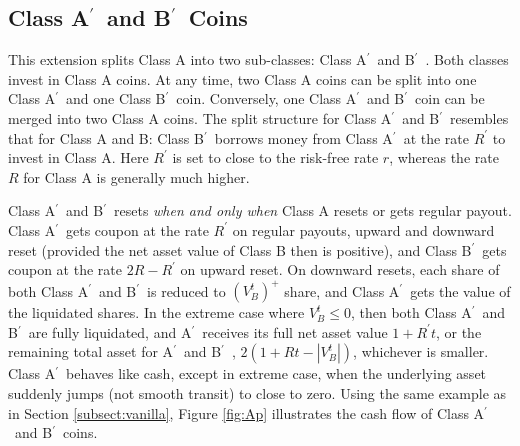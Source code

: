 \documentclass[draft, noinfoline]{ectaart}
\numberwithin{equation}{section}
\theoremstyle{plain}
\newcommand{\Ap}{A\ensuremath{^\prime}~}
\newcommand{\Bp}{B\ensuremath{^\prime}~}
\begin{document}
\subsection{\texorpdfstring{Class \Ap and \Bp Coins}{Lg}}
This extension splits Class A into two sub-classes: Class \Ap and \Bp. Both classes invest in Class A coins. At any time, two Class A coins can be split into one Class \Ap and one Class \Bp coin. Conversely, one Class \Ap and \Bp coin can be merged into two Class A coins. The split structure for Class \Ap and \Bp resembles that for Class A and B: Class \Bp borrows money from Class \Ap at the rate $R^\prime$ to invest in Class A. Here $R^\prime$ is set to close to the risk-free rate $r$, whereas the rate $R$ for Class A is generally much higher.

Class \Ap and \Bp resets {\it when and only when} Class A resets or gets regular payout. Class \Ap gets coupon at the rate $R^\prime$ on regular payouts, upward and downward reset (provided the net asset value of Class B then is positive), and Class \Bp gets coupon at the rate $2R-R^\prime$ on upward reset. On downward resets, each share of both Class \Ap and \Bp is reduced to $(V_B^t)^+$ share, and Class \Ap gets the value of the liquidated shares. In the extreme case where $V_B^t\le 0$, then both Class \Ap and \Bp are fully liquidated, and \Ap receives its full net asset value $1+R^\prime t$, or the remaining total asset for \Ap and \Bp, $2(1+Rt-|V_B^t|)$, whichever is smaller. Class \Ap behaves like cash, except in extreme case, when the underlying asset suddenly jumps (not smooth transit) to close to zero. Using the same example as in Section \ref{subsect:vanilla}, Figure \ref{fig:Ap} illustrates the cash flow of Class \Ap and \Bp coins.






\end{document}
